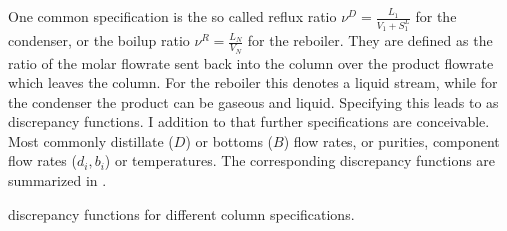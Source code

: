         One common specification is the so called reflux ratio $\nu^D = \frac{L_1}{V_1 + S_1^L}$ for
        the condenser, or the boilup ratio $\nu^R = \frac{L_N}{V_N}$ for the reboiler.
        They are defined as the ratio of the molar flowrate sent back into the column over the
        product flowrate which leaves the column. For the reboiler this denotes a liquid stream,
        while for the condenser the product can be gaseous and liquid. Specifying this leads to
        as discrepancy functions. I addition to that further specifications are conceivable. Most
        commonly distillate ($D$) or bottoms ($B$) flow rates, or purities, component flow rates ($d_i, b_i$)
        or temperatures. The corresponding discrepancy functions are summarized in .

        \begin{table}
            \centering
            \footnotesize
            
            \caption{discrepancy functions for different column specifications.}
            \label{tab:discrepancy}
        \end{table}

